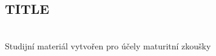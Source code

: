 \documentclass[main.tex]{subfiles}
\begin{document}
\pagestyle{empty}
\pagecolor{MPC}

\begin{titlepage}
\centering
\vspace*{\fill}
{\color{white}
\part*{TITLE}
}
\vspace*{1em}
{\color{white}\LARGE \WSauthor}\\
\vspace*{1em}
{\color{white}\Large Studijní materiál vytvořen pro účely maturitní zkoušky}
\vspace*{\fill}
\end{titlepage}

\newpage

\blankpage

\newpage
\end{document}
